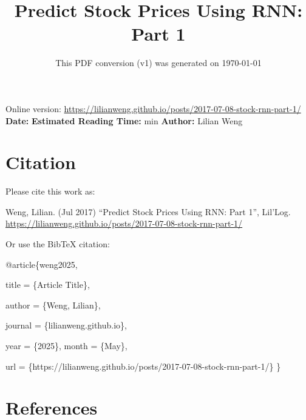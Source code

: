 \documentclass[12pt]{article}
\title{Predict Stock Prices Using RNN: Part 1}
\date{This PDF conversion (v1) was generated on \today\footnotemark}
\begin{document}
\maketitle
\begin{center}
    Online version: \url{https://lilianweng.github.io/posts/2017-07-08-stock-rnn-part-1/} \\
    \textbf{Date:} \quad
    \textbf{Estimated Reading Time:}  min \quad
    \textbf{Author:} Lilian Weng
\end{center}




\newpage
\tableofcontents
\newpage
\vspace{1em}
\n\n\n\section{Citation}
Please cite this work as:

\begin{tcolorbox}[colback=black!5!white, colframe=black!80!white, boxrule=0.5pt, arc=2mm, left=1mm, right=1mm, top=1mm, bottom=1mm]
  Weng, Lilian. (Jul 2017) ``Predict Stock Prices Using RNN: Part 1'', Lil'Log. \url{https://lilianweng.github.io/posts/2017-07-08-stock-rnn-part-1/}
  \end{tcolorbox}

Or use the BibTeX citation:

\begin{tcolorbox}[
    colback=black!5!white,
    colframe=black!80!white,
    boxrule=0.5pt,
    arc=2mm,
    left=1mm,
    right=1mm,
    top=1mm,
    bottom=1mm,
    listing only,
    listing options={
      basicstyle=\ttfamily\footnotesize,
      breaklines=true,
      literate={\{}{{\char`\{}}1 {\}}{{\char`\}}}1
    }
  ]
  @article\{weng2025,

    title   = \{Article Title\},

    author  = \{Weng, Lilian\},

    journal = \{lilianweng.github.io\},

    year    = \{2025\},
    month   = \{May\},

    url     = \{https://lilianweng.github.io/posts/2017-07-08-stock-rnn-part-1/\}\n
  \}
  \end{tcolorbox}

\newpage
\section{References}

\n
\end{document}
